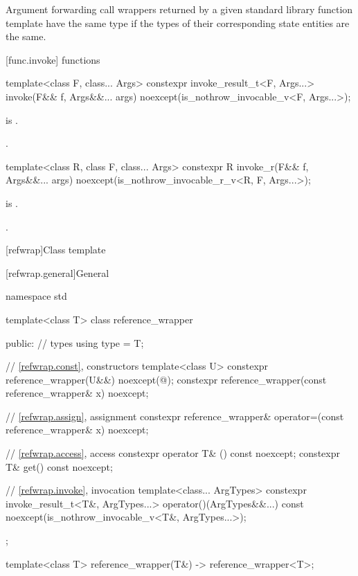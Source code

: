 \pnum
Argument forwarding call wrappers returned by
a given standard library function template have the same type
if the types of their corresponding state entities are the same.

[func.invoke]{ functions}
%
%
\begin{itemdecl}
template<class F, class... Args>
  constexpr invoke_result_t<F, Args...> invoke(F&& f, Args&&... args)
    noexcept(is_nothrow_invocable_v<F, Args...>);
\end{itemdecl}

\begin{itemdescr}
\pnum
\constraints
{} is .

\pnum
\returns
{}.
\end{itemdescr}

%
\begin{itemdecl}
template<class R, class F, class... Args>
  constexpr R invoke_r(F&& f, Args&&... args)
    noexcept(is_nothrow_invocable_r_v<R, F, Args...>);
\end{itemdecl}

\begin{itemdescr}
\pnum
\constraints
{} is .

\pnum
\returns
{}.
\end{itemdescr}

[refwrap]{Class template }

[refwrap.general]{General}

%
%
\begin{codeblock}
namespace std {
  template<class T> class reference_wrapper {
  public:
    // types
    using type = T;

    // \ref{refwrap.const}, constructors
    template<class U>
      constexpr reference_wrapper(U&&) noexcept(@\seebelow@);
    constexpr reference_wrapper(const reference_wrapper& x) noexcept;

    // \ref{refwrap.assign}, assignment
    constexpr reference_wrapper& operator=(const reference_wrapper& x) noexcept;

    // \ref{refwrap.access}, access
    constexpr operator T& () const noexcept;
    constexpr T& get() const noexcept;

    // \ref{refwrap.invoke}, invocation
    template<class... ArgTypes>
      constexpr invoke_result_t<T&, ArgTypes...> operator()(ArgTypes&&...) const
        noexcept(is_nothrow_invocable_v<T&, ArgTypes...>);
  };

  template<class T>
    reference_wrapper(T&) -> reference_wrapper<T>;
}
\end{codeblock}

